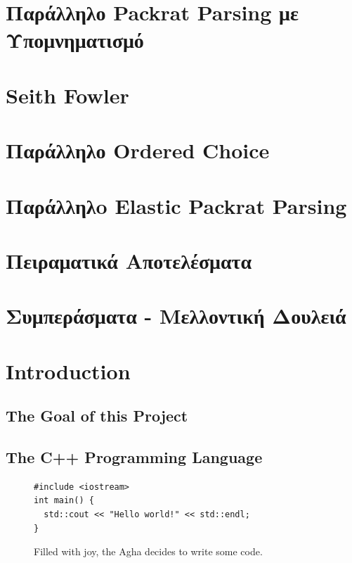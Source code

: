 \documentclass[diploma]{softlab-thesis}
\begin{document}
\chapter{ Παράλληλο Packrat Parsing με Υπομνηματισμό }

\chapter{ Seith Fowler}

\chapter{ Παράλληλο Ordered Choice }

\chapter{ Παράλληλo Elastic Packrat Parsing }

\chapter{  Πειραματικά Αποτελέσματα }

\chapter{ Συμπεράσματα - Μελλοντική Δουλειά }

\englishtext

\chapter{Introduction}

\section{The Goal of this Project}

\section{The C++ Programming Language}


\begin{figure}[t]
\setlength\partopsep{-\topsep}%
\begin{verbatim}
#include <iostream>
int main() {
  std::cout << "Hello world!" << std::endl;
}
\end{verbatim}
\caption{Filled with joy, the Agha decides to write some code.%
  \label{fig:hello-english}}
\end{figure}
\end{document}
